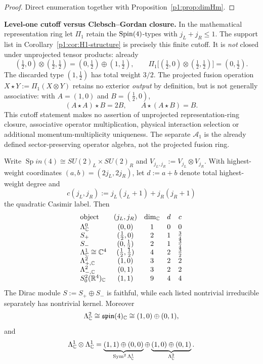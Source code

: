 \documentclass[11pt]{article}
\begin{document}
\begin{proof}
Direct enumeration together with Proposition~\ref{p1:prop:dimHm}.
\end{proof}

\noindent\textbf{Level-one cutoff versus Clebsch--Gordan closure.}
In the mathematical representation ring let \(\Pi_1\) retain the
\(\mathrm{Spin}(4)\)-types with \(j_L+j_R\le1\).  The support list in
Corollary~\ref{p1:cor:H1-structure} is precisely this finite cutoff.
It is \emph{not} closed under unprojected tensor products: already
\[
(\tfrac12,0)\otimes(\tfrac12,\tfrac12)
  =(0,\tfrac12)\oplus(1,\tfrac12),\qquad
\Pi_1\bigl[(\tfrac12,0)\otimes(\tfrac12,\tfrac12)\bigr]
  =(0,\tfrac12).
\]
The discarded type \((1,\tfrac12)\) has total weight \(3/2\).
The projected fusion operation \(X\star Y:=\Pi_1(X\otimes Y)\)
retains no exterior \emph{output} by definition, but is not generally
associative: with \(A=(1,0)\) and \(B=(\tfrac12,0)\),
\[
 (A\star A)\star B=2B,\qquad A\star(A\star B)=B.
\]
This cutoff statement makes no assertion of unprojected representation-ring
closure, associative operator multiplication, physical interaction selection
or additional momentum-multiplicity uniqueness.  The separate
\(\mathcal A_1\) is the already defined sector-preserving operator
algebra, not the projected fusion ring.


\begin{proposition}
\label{p1:prop:spin4-low-degree-dictionary}
Write \(\operatorname{Sp}in(4)\cong SU(2)_L\times SU(2)_R\) and
\(V_{j_L,j_R}:=V_{j_L}\otimes V_{j_R}\).  With highest-weight coordinates
\((a,b)=(2j_L,2j_R)\), let \(d:=a+b\) denote total highest-weight degree and
\[
 c(j_L,j_R):=j_L(j_L+1)+j_R(j_R+1)
\]
the quadratic Casimir label.  Then
\[
\begin{array}{lcccc}
\text{object} & (j_L,j_R) & \dim_{\mathbb{C}} & d & c\\[2pt]
\Lambda^0_{\mathbb{C}} & (0,0) & 1 & 0 & 0\\
S_+ & (\tfrac12,0) & 2 & 1 & \tfrac34\\
S_- & (0,\tfrac12) & 2 & 1 & \tfrac34\\
\Lambda^1_{\mathbb{C}}\cong\mathbb{C}^4 & (\tfrac12,\tfrac12) & 4 & 2 & \tfrac32\\
\Lambda^2_{+,\mathbb{C}} & (1,0) & 3 & 2 & 2\\
\Lambda^2_{-,\mathbb{C}} & (0,1) & 3 & 2 & 2\\
S^2_0(\mathbb{R}^4)_{\mathbb{C}} & (1,1) & 9 & 4 & 4
\end{array}
\]
The Dirac module \(S:=S_+\oplus S_-\) is faithful, while each listed
nontrivial irreducible separately has nontrivial kernel.  Moreover
\[
 \Lambda^2_{\mathbb{C}}
 \cong\mathfrak{spin}(4)_{\mathbb{C}}
 \cong (1,0)\oplus(0,1),
\]
and
\[
 \Lambda^1_{\mathbb{C}}\otimes\Lambda^1_{\mathbb{C}}
 =\underbrace{(1,1)\oplus(0,0)}_{\operatorname{Sym}^2\Lambda^1_{\mathbb{C}}}
 \oplus
 \underbrace{(1,0)\oplus(0,1)}_{\Lambda^2_{\mathbb{C}}}.
\]
\end{proposition}
\end{document}
